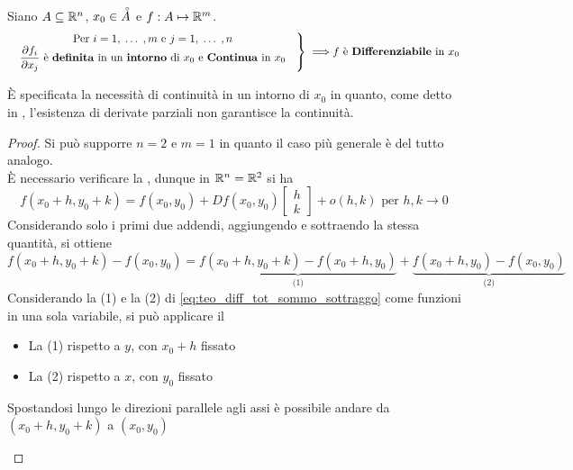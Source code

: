 \begin{theorem}
	\label{teo:diff_tot}
	Siano $A \subseteq \mathbb{R}^n$, $x_0 \in \accentset{\circ}{A}$ e $f:A \mapsto \mathbb{R}^m$.
	\[
		\left.
		\text{
			\begin{tabular}{c}
				Per $i = 1,\;\dotsc\;,m$ e $j = 1,\;\dotsc\;,n$\\
				$\frac{\partial f_i}{\partial x_j}$ è \textbf{definita} in un \textbf{intorno} di $x_0$ e \textbf{Continua} in $x_0$
			\end{tabular}
		}
		\right\}
		\implies\\
		f \text{ è \textbf{Differenziabile} in } x_0
	\]
	\vspace*{-\baselineskip}
	\begin{note}
		È specificata la necessità di continuità in un intorno di $x_0$ in quanto, come detto in , l'esistenza di derivate parziali non garantisce la continuità.
	\end{note}
	\begin{proof}
		Si può supporre $n = 2$ e $m = 1$ in quanto il caso più generale è del tutto analogo.\\
		È necessario verificare la , dunque in $\mathbb{R}^n = \mathbb{R}^2$ si ha
		\begin{equation}
			\label{eq:deriv_tot_def_diff}
			f(x_0 + h, y_0 + k) = f(x_0, y_0) + Df(x_0, y_0) \begin{bmatrix}h\\k\end{bmatrix} + o(h,k) \text{ per } h,k \to 0
		\end{equation}
		Considerando solo i primi due addendi, aggiungendo e sottraendo la stessa quantità, si ottiene
		\begin{equation}
			\label{eq:teo_diff_tot_sommo_sottraggo}
			f(x_0 + h, y_0 + k) - f(x_0, y_0) = \underbrace{f(x_0 + h, y_0 + k) - f(x_0+h,y_0)}_{\text{(1)}} + \underbrace{f(x_0+h,y_0) - f(x_0, y_0)}_{\text{(2)}}
		\end{equation}
		Considerando la (1) e la (2) di \cref{eq:teo_diff_tot_sommo_sottraggo} come funzioni in una sola variabile, si può applicare il 
		\begin{itemize}
			\item La (1) rispetto a $y$, con $x_0 + h$ fissato
			\item La (2) rispetto a $x$, con $y_0$ fissato
		\end{itemize}
		Spostandosi lungo le direzioni parallele agli assi è possibile andare da $(x_0 + h, y_0 + k)$ a $(x_0, y_0)$
		\begin{center}
\end{center}
\end{proof}
\end{theorem}
